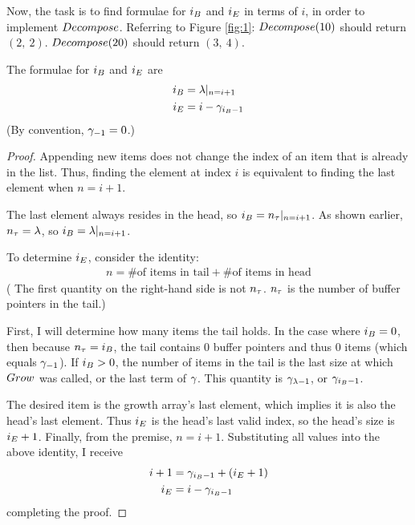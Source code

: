 Now, the task is to find formulae for $i_B$ and $i_E$ in terms of $i$, in order to implement $Decompose$. Referring to Figure \ref{fig:1}: $Decompose(10)$ should return $(2,\ 2)$. $Decompose(20)$ should return $(3,\ 4)$.

\begin{lemma}
	The formulae for $i_B$ and $i_E$ are
	\begin{align*}
	i_B &= \lambda|_{n = i + 1}\\
	i_E &= i - \gamma_{i_B - 1}
	\end{align*}
	(By convention, $\gamma_{-1} = 0$.)
\end{lemma}

\begin{proof}
	Appending new items does not change the index of an item that is already in the list. Thus, finding the element at index $i$ is equivalent to finding the last element when $n = i + 1$.
	
	The last element always resides in the head, so $i_B = n_\tau|_{n = i + 1}$. As shown earlier, $n_\tau = \lambda$, so $i_B = \lambda|_{n = i + 1}$.
	
	To determine $i_E$, consider the identity:
	\begin{align*}
	n = \text{\# of items in tail} + \text{\# of items in head}
	\end{align*}
	({\HdrNote} The first quantity on the right-hand side is not $n_\tau$. $n_\tau$ is the number of buffer pointers in the tail.)
	
	First, I will determine how many items the tail holds. In the case where $i_B = 0$, then because $n_\tau = i_B$, the tail contains $0$ buffer pointers and thus $0$ items (which equals $\gamma_{-1}$). If $i_B > 0$, the number of items in the tail is the last size at which $Grow$ was called, or the last term of $\gamma$. This quantity is $\gamma_{\lambda - 1}$, or $\gamma_{i_B - 1}$.
	
	The desired item is the growth array's last element, which implies it is also the head's last element. Thus $i_E$ is the head's last valid index, so the head's size is $i_E + 1$. Finally, from the premise, $n = i + 1$. Substituting all values into the above identity, I receive
	\begin{align*}
	i + 1 &= \gamma_{i_B - 1} + (i_E + 1)\\
	i_E &= i - \gamma_{i_B - 1}
	\end{align*}
	completing the proof.
\end{proof}

